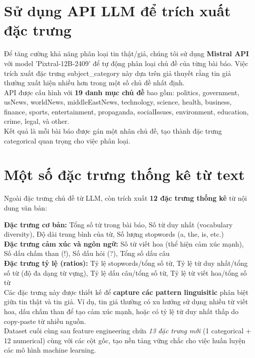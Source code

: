 \setlength{\parskip}{2pt}
\linespread{1}

\section{Sử dụng API LLM để trích xuất đặc trưng}

Để tăng cường khả năng phân loại tin thật/giả, chúng tôi sử dụng \textbf{Mistral API} với model 'Pixtral-12B-2409' để tự động phân loại chủ đề của từng bài báo. Việc trích xuất đặc trưng subject\_category này dựa trên giả thuyết rằng tin giả thường xuất hiện nhiều hơn trong một số chủ đề nhất định.\\

\noindent API được cấu hình với \textbf{19 danh mục chủ đề} bao gồm: politics, government, usNews, worldNews, middleEastNews, technology, science, health, business, finance, sports, entertainment, propaganda, socialIssues, environment, education, crime, legal, và other.\\

\noindent Kết quả là mỗi bài báo được gán một nhãn chủ đề, tạo thành đặc trưng categorical quan trọng cho việc phân loại.

\section{Một số đặc trưng thống kê từ text}

Ngoài đặc trưng chủ đề từ LLM, còn trích xuất \textbf{12 đặc trưng thống kê} từ nội dung văn bản:

\noindent\textbf{Đặc trưng cơ bản:}
\text Tổng số từ trong bài báo, Số từ duy nhất (vocabulary diversity), Độ dài trung bình của từ, Số lượng stopwords (a, the, is, etc.)\\

\noindent\textbf{Đặc trưng cảm xúc và ngôn ngữ:}
\text Số từ viết hoa (thể hiện cảm xúc mạnh), Số dấu chấm than (!), Số dấu hỏi (?), Tổng số dấu câu\\

\noindent\textbf{Đặc trưng tỷ lệ (ratios):}
Tỷ lệ stopwords/tổng số từ, Tỷ lệ từ duy nhất/tổng số từ (độ đa dạng từ vựng), Tỷ lệ dấu câu/tổng số từ, Tỷ lệ từ viết hoa/tổng số từ\\

\noindent Các đặc trưng này được thiết kế để \textbf{capture các pattern linguisitic} phân biệt giữa tin thật và tin giả. Ví dụ, tin giả thường có xu hướng sử dụng nhiều từ viết hoa, dấu chấm than để tạo cảm xúc mạnh, hoặc có tỷ lệ từ duy nhất thấp do copy-paste từ nhiều nguồn.\\

\noindent Dataset cuối cùng sau feature engineering chứa \textit{13 đặc trưng mới} (1 categorical + 12 numerical) cùng với các cột gốc, tạo nền tảng vững chắc cho việc huấn luyện các mô hình machine learning.